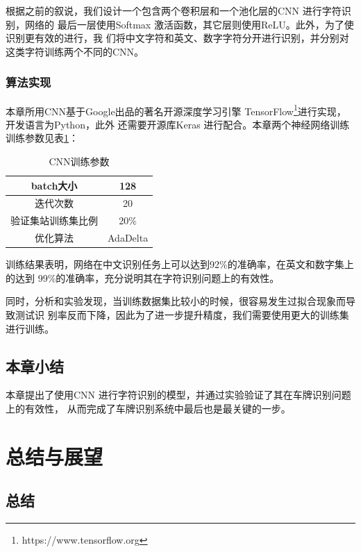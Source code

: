 根据之前的叙说，我们设计一个包含两个卷积层和一个池化层的CNN 进行字符识别，网络的
最后一层使用Softmax 激活函数，其它层则使用ReLU。此外，为了使识别更有效的进行，我
们将中文字符和英文、数字字符分开进行识别，并分别对这类字符训练两个不同的CNN。

\subsection{算法实现}

本章所用CNN基于Google出品的著名开源深度学习引擎
TensorFlow\footnote{https://www.tensorflow.org}进行实现，开发语言为Python，此外
还需要开源库Keras 进行配合。本章两个神经网络训练训练参数见表\ref{Tab:RecogCNNArgs}：

\begin{table}[ht]
\centering
\caption{CNN训练参数}\label{Tab:RecogCNNArgs}
\begin{tabular}{|c|c|}
\hline
  batch大小 & 128 \\
\hline
  迭代次数 & 20 \\
\hline
  验证集站训练集比例 & 20\% \\
\hline
  优化算法 & AdaDelta\cite{Zeiler:2012uw} \\
\hline
\end{tabular}
\end{table}

训练结果表明，网络在中文识别任务上可以达到92\%的准确率，在英文和数字集上的达到
99\%的准确率，充分说明其在字符识别问题上的有效性。

同时，分析和实验发现，当训练数据集比较小的时候，很容易发生过拟合现象而导致测试识
别率反而下降，因此为了进一步提升精度，我们需要使用更大的训练集进行训练。

\section{本章小结}

本章提出了使用CNN 进行字符识别的模型，并通过实验验证了其在车牌识别问题上的有效性，
从而完成了车牌识别系统中最后也是最关键的一步。

\chapter{总结与展望}

\section{总结}

